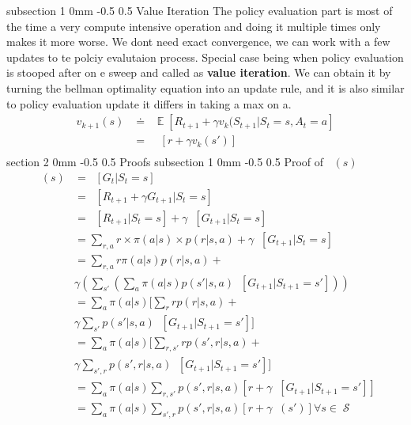 \documentclass[twocolumn,11pt]{article}
\makeatletter
\DeclareMathOperator{\E}{\mathbb{E}}
\DeclareMathOperator{\state}{\mathcal{S}}
\DeclareMathOperator{\vp}{v_\pi} %
\DeclareMathOperator{\Ep}{\E_\pi}
\DeclareMathOperator{\maxa}{\underset{a}{\text{max }}}
\DeclareMathOperator{\dynamics}{\sum_{s',r} p(s',r|s,a)}
\renewcommand{\section}{\@startsection
{section}%
{2}%
{0mm}%
{-0.5\baselineskip}%
{0.5\baselineskip}%
{\bfseries\color{blue}}} %
\renewcommand{\subsection}{\@startsection
{subsection}%
{1}%
{0mm}%
{-0.5\baselineskip}%
{0.5\baselineskip}%
{\bfseries\color{blue}}} %
\makeatother
\begin{document}
\subsection{Value Iteration} 
The policy evaluation part is most of the time a very compute intensive operation and doing it multiple times only makes it more worse. We dont need exact convergence, we can work with a few updates to te polciy evalutaion process. Special case being when policy evaluation is stooped after on e sweep and called as \textbf{value iteration}.
We can obtain it by turning the bellman optimality equation into an update rule, and it is also similar to policy evaluation update it differs in taking a max on a.
\begin{align}
	v_{k+1}(s) &\doteq \maxa \E[R_{t+1} + \gamma v_{k}(S_{t+1}|S_{t} = s , A_{t}=a]\\
	&= \maxa \dynamics [r + \gamma v_{k}(s')]\\
\end{align}
\section{Proofs}
\subsection{Proof of $\vp(s)$}
\begin{align*}
	\vp(s) &= \Ep[G_t | S_t = s] \\
	&= \Ep [R_{t+1} + \gamma G_{t+1} | S_t = s]\\
	&= \Ep[R_{t+1}  | S_t= s] + \gamma \Ep[G_{t+1} | S_t= s]\\
	&= \sum_{r,  a} r \times \pi(a|s) \times p(r|s,a) + \gamma  \Ep[G_{t+1} | S_t= s]\\
	&= \sum_{r,  a} r \pi(a|s)  p(r|s,a) +\\
	& \gamma  ( \sum_{s'}( \sum_a \pi(a|s)p(s'|s,a)  \Ep[G_{t+1} | S_{t+1} = s']))\\
	&= \sum_a \pi(a|s) [  \sum_r r p(r|s,a) + \\
	&\gamma \sum_{s'}p(s'|s,a) \Ep[G_{t+1} | S_{t+1} = s']  ]\\
	&= \sum_a \pi(a|s) [  \sum_{r,s'} r p(s',r|s,a) +\\
	& \gamma \sum_{s',r}p(s',r|s,a) \Ep[G_{t+1} | S_{t+1} = s']  ]\\
	&= \sum_a \pi(a|s) \sum_{r,s'} p(s',r|s,a)[ r + \gamma \Ep[G_{t+1} | S_{t+1} = s']  ]\\
	&= \sum_a \pi(a|s) \sum_{s',r} p(s',r|s,a) [r + \gamma \vp(s')] \forall s \in \state
\end{align*}
\end{document}
